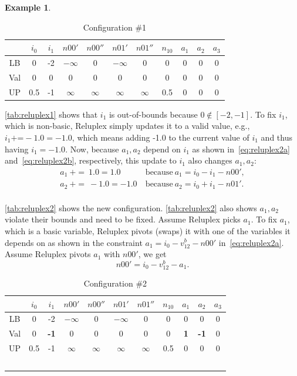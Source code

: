 \documentclass[oneside,11pt,dvipsnames]{book}
\numberwithin{equation}{section}
\theoremstyle{definition}
\newtheorem{example}{Example}[section]
\theoremstyle{remark}
\begin{document}
\begin{example}
\begin{table}[h]
    \centering
\begin{tabular}{ccccccccccc}
     & $i_0$ & $i_1$ & $n00'$ & $n00''$ & $n01'$ & $n01''$ & $n_{10}$ &$a_1$&$a_2$&$a_3$ \\
    \midrule
    LB & 0 & -2 & $-\infty$&0&$-\infty$& 0 & 0 & 0 & 0 &0\\
    Val& 0 & 0 & 0 & 0 & 0 & 0 & 0 & 0 & 0 & 0\\
    UP & 0.5 & -1 &$\infty$&$\infty$&$\infty$&$\infty$&0.5& 0 & 0 & 0
\end{tabular}
\caption{Configuration \#1}\label{tab:reluplex1}
\end{table}

\autoref{tab:reluplex1} shows that $i_1$ is out-of-bounds because $0 \notin [-2,-1]$. To fix $i_1$, which is non-basic, Reluplex simply updates it to a valid value, e.g., $i_1 \texttt{+=} -1.0 = -1.0$, which means adding -1.0 to the current value of $i_1$ and thus having $i_1= -1.0$.
Now, because $a_1, a_2$ depend on $i_1$ as shown in~\autoref{eq:reluplex2a} and~\autoref{eq:reluplex2b}, respectively, this update to $i_1$ also changes $a_1,a_2$:
    \begin{align*}
        a_1 ~+=~ 1.0 = 1.0   &~\text{because}~ a_1=i_0 - i_1 - n00', \\
        a_2 ~+=~ -1.0 = -1.0  & ~\text{because}~ a_2=i_0 + i_1 - n01'.\\
    \end{align*}



\autoref{tab:reluplex2} shows the new configuration.
\autoref{tab:reluplex2} also shows $a_1, a_2$ violate their bounds and need to be fixed. Assume Reluplex picks $a_1$. To fix $a_1$, which is a basic variable, Reluplex pivots (swaps) it with one of the variables it depends on as shown in the constraint $ a_1 = i_0 - v^b_{12} - n00'$ in~\autoref{eq:reluplex2a}. Assume Reluplex pivots $a_1$ with $n00'$, we get
\begin{equation}\label{eq:reluplex5}
n00' = i_0 - v^b_{12} - a_1.
\end{equation}


\begin{table}[h]
    \centering
\begin{tabular}{ccccccccccc}
     & $i_0$ & $i_1$ & $n00'$ & $n00''$ & $n01'$ & $n01''$ & $n_{10}$ &$a_1$&$a_2$&$a_3$ \\
    \midrule
    LB & 0 & -2 & $-\infty$&0&$-\infty$& 0 & 0 & 0 & 0 &0\\
    Val& 0 & \textbf{-1} & 0 & 0 & 0 & 0 & 0 & \textbf{1} & \textbf{-1} & 0\\
    UP & 0.5 & -1 &$\infty$&$\infty$&$\infty$&$\infty$&0.5& 0 & 0 & 0\\\
\end{tabular}
\caption{Configuration \#2}\label{tab:reluplex2}
\end{table}



\end{example}
\end{document}
